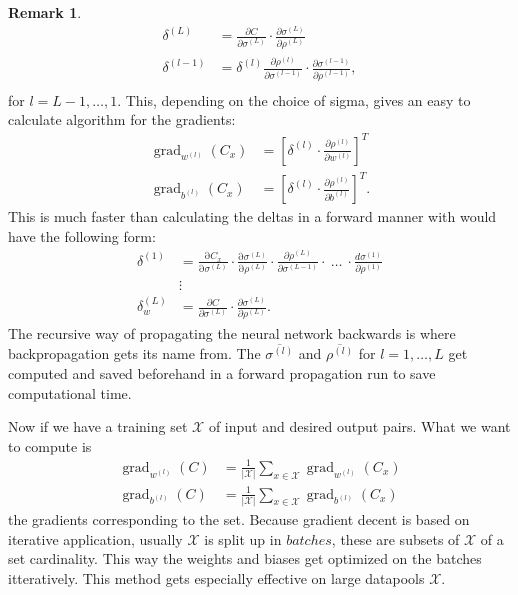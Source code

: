 \documentclass{article}
\theoremstyle{definition}
\newtheorem{remark}[theorem]{Remark}
\DeclareMathOperator{\grad}{grad}
\begin{document}
\begin{remark}
\begin{align*}
\delta^{(L)} &= \frac{\partial C}{\partial \sigma^{(L)}} \cdot \frac{\partial \sigma^{(L)}}{\partial \rho^{(L)}} \\
\delta^{(l-1)} &= \delta^{(l)} \frac{\partial \rho^{(l)}}{\partial \sigma^{(l-1)}} \cdot \frac{\partial \sigma^{(l-1)}}{\partial \rho^{(l-1)}}, \\
\end{align*}
for $l=L-1, \dots, 1$.
This, depending on the choice of sigma, gives an easy to calculate algorithm for the gradients:
\begin{align*}
\grad_{w^{(l)}}(C_x) &= \left[\delta^{(l)} \cdot \frac{\partial \rho^{(l)}}{\partial w^{(l)}}\right]^{T} \\
\grad_{b^{(l)}}(C_x) &= \left[\delta^{(l)} \cdot \frac{\partial \rho^{(l)}}{\partial b^{(l)}}\right]^{T}.
\end{align*}
This is much faster than calculating the deltas in a forward manner with would have the following form:
\begin{align*}
\delta^{(1)} &= \frac{\mathrm \partial C_{x}}{\mathrm \partial \sigma^{(L)}} \cdot \frac{\mathrm \partial \sigma^{(L)}}{\mathrm \partial \rho^{(L)}} \cdot \frac{\partial \rho^{(L)}}{\partial \sigma^{(L-1)}} \cdot \ \ldots \ \cdot \frac{d \sigma^{(1)}}{\partial \rho^{(1)}} \\
&\vdots \\
\delta^{(L)}_{w} &= \frac{\partial C}{\partial \sigma^{(L)}} \cdot \frac{\partial \sigma^{(L)}}{\partial \rho^{(L)}}.
\end{align*}
The recursive way of propagating the neural network backwards is where backpropagation gets its name from. The $\overline{\sigma^{(l)}}$ and $\overline{\rho^{(l)}}$ for $l = 1, \dots , L$ get computed and saved beforehand in a forward propagation run to save computational time.

Now if we have a training set $\mathcal{X}$ of input and desired output pairs. What we want to compute is
\begin{align*}
\grad_{w^{(l)}}(C) &= \frac{1}{|\mathcal{X}|}\sum_{x \in \mathcal{X}}\grad_{w^{(l)}}(C_x) \\
\grad_{b^{(l)}}(C) &= \frac{1}{|\mathcal{X}|}\sum_{x \in \mathcal{X}}\grad_{b^{(l)}}(C_x)
\end{align*}
the gradients corresponding to the set. Because gradient decent is based on iterative application, usually $\mathcal{X}$ is split up in $batches$, these are subsets of $\mathcal{X}$ of a set cardinality. This way the weights and biases get optimized on the batches itteratively. This method gets especially effective on large datapools $\mathcal{X}$.
\end{remark}
\end{document}
